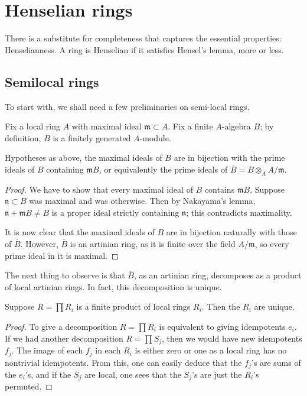 \section{Henselian rings}



There is a substitute for completeness that captures the essential
properties: Henselianness. A ring is Henselian if it satisfies
Hensel's lemma, more or less.

\subsection{Semilocal rings}

To start with, we shall need a few preliminaries on semi-local rings.

Fix a local ring $A$ with maximal ideal $\mathfrak{m} \subset A$.
Fix a finite $A$-algebra $B$; by definition, $B $ is a finitely
generated $A$-module.

\begin{proposition} 
Hypotheses as above, the maximal ideals of $B$ are in bijection with
the prime ideals of $B $ containing $\mathfrak{m} B$, or equivalently
the prime ideals of $\overline{B} = B \otimes_A A/\mathfrak{m}$.
\end{proposition}

\begin{proof} 
We have to show that every maximal ideal of $B$ contains $\mathfrak{m}
B$. Suppose $\mathfrak{n} \subset B$ was maximal and was otherwise.
Then by Nakayama's lemma, $\mathfrak{n} + \mathfrak{m} B \neq B$ is a
proper ideal strictly containing $\mathfrak{n}$; this contradicts
maximality.

It is now clear that the maximal ideals of $B$ are in bijection
naturally with those of $\overline{B}$. 
However, $\overline{B}$ is an artinian ring, as it is finite over the
field $A/\mathfrak{m}$, so every prime ideal in it is maximal.
\end{proof}



The next thing to observe is that $\overline{B}$, as an artinian ring,
decomposes  as a product of local artinian rings.
In fact, this decomposition is unique.

\begin{proposition} 
Suppose $R = \prod R_i$ is a finite product of local rings $R_i$. Then
the $R_i$ are unique.
\end{proposition}
\begin{proof} 
To give a decomposition $R = \prod R_i$ is equivalent to giving
idempotents $e_i$. If we had another decomposition $R = \prod S_j$,
then we would have new idempotents $f_j$. The image of each $f_j$ in
each $R_i$ is either zero or one as a local ring has no nontrivial
idempotents. From this, one can easily deduce that the $f_j$'s are
sums of the $e_i$'s, and if the $S_j$ are local, one sees that the
$S_j$'s are just the $R_i$'s permuted. 
\end{proof}

